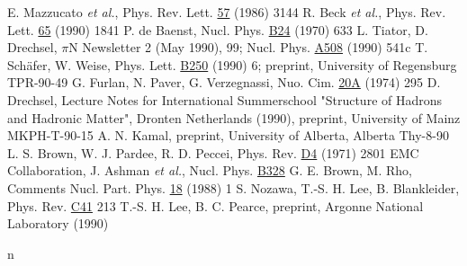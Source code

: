 \begin{thebibliography}{99}
 E. Mazzucato {\em et al.}, Phys. Rev. Lett. {\underline{57}}
              (1986) 3144
 R. Beck {\em et al.}, Phys. Rev. Lett. {\underline{65}} (1990)
              1841
 P. de Baenst, Nucl. Phys. {\underline{B24}} (1970) 633
  L. Tiator, D. Drechsel, $\pi$N Newsletter 2 (May 1990), 99;
              Nucl. Phys. {\underline{A508}} (1990) 541c
  T. Sch\"afer, W. Weise, Phys. Lett. {\underline{B250}} (1990) 6;
              preprint, University of Regensburg TPR-90-49
 G. Furlan, N. Paver, G. Verzegnassi, Nuo. Cim. {\underline{20A}}
              (1974) 295
 D. Drechsel, Lecture Notes for International Summerschool
              "Structure of Hadrons and Hadronic Matter", Dronten Netherlands
	      (1990), preprint, University of Mainz MKPH-T-90-15
 A. N. Kamal, preprint, University of Alberta, Alberta Thy-8-90 
 L. S. Brown, W. J. Pardee, R. D. Peccei, Phys. Rev. 
              {\underline{D4}} (1971) 2801      
 EMC Collaboration, J. Ashman {\em et al.}, Nucl. Phys.
              {\underline{B328}}
  G. E. Brown, M. Rho, Comments Nucl. Part. Phys. 
              \underline{18} (1988) 1
 S. Nozawa, T.-S. H. Lee, B. Blankleider, Phys. Rev. 
              \underline{C41} 213 	      	      
  T.-S. H. Lee, B. C. Pearce, preprint, 
              Argonne National Laboratory (1990) 
	      
\end{thebibliography}
n